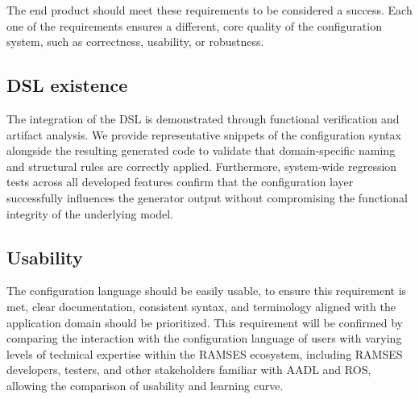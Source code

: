 The end product should meet these requirements to be considered a success. Each one of the requirements ensures a different, core quality of the configuration system, such as correctness, usability, or robustness. %

\subsection{DSL existence}

The integration of the \gls{DSL} is demonstrated through functional verification and artifact analysis. We provide representative snippets of the configuration syntax alongside the resulting generated code to validate that domain-specific naming and structural rules are correctly applied. Furthermore, system-wide regression tests across all developed features confirm that the configuration layer successfully influences the generator output without compromising the functional integrity of the underlying model.




\subsection{Usability}

The configuration language should be easily usable, to ensure this requirement is met, clear documentation, consistent syntax, and terminology aligned with the application domain should be prioritized. This requirement will be confirmed by comparing the interaction with the configuration language of users with varying levels of technical expertise within the \gls{RAMSES} ecosystem, including \gls{RAMSES} developers, testers, and other stakeholders familiar with \gls{AADL} and \gls{ROS}, allowing the comparison of usability and learning curve.


